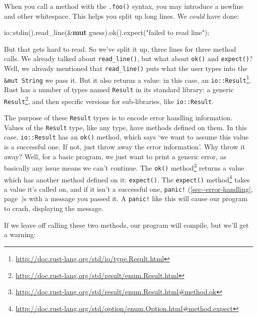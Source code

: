 \documentclass[a4paper,]{book}
\renewcommand*{\hyperref}[2][\ar]{%
  \def\ar{#2}%
  #2 (\autoref{#1}, page~\pageref{#1})}
\newenvironment{Shaded}{\begin{snugshade}}{\end{snugshade}}
\newcommand{\KeywordTok}[1]{\textcolor[rgb]{0.13,0.29,0.53}{\textbf{{#1}}}}
\newcommand{\StringTok}[1]{\textcolor[rgb]{0.31,0.60,0.02}{{#1}}}
\newcommand{\CommentTok}[1]{\textcolor[rgb]{0.56,0.35,0.01}{\textit{{#1}}}}
\newcommand{\NormalTok}[1]{{#1}}
\renewcommand{\href}[2]{#2\footnote{\url{#1}}}
\begin{document}
When you call a method with the \texttt{.foo()} syntax, you may
introduce a newline and other whitespace. This helps you split up long
lines. We \emph{could} have done:

\begin{Shaded}
\begin{Highlighting}[]
    \NormalTok{io::stdin().read_line(&}\KeywordTok{mut} \NormalTok{guess).ok().expect(}\StringTok{"failed to read line"}\NormalTok{);}
\end{Highlighting}
\end{Shaded}

But that gets hard to read. So we've split it up, three lines for three
method calls. We already talked about \texttt{read\_line()}, but what
about \texttt{ok()} and \texttt{expect()}? Well, we already mentioned
that \texttt{read\_line()} puts what the user types into the
\texttt{\&mut\ String} we pass it. But it also returns a value: in this
case, an
\href{http://doc.rust-lang.org/std/io/type.Result.html}{\texttt{io::Result}}.
Rust has a number of types named \texttt{Result} in its standard
library: a generic
\href{http://doc.rust-lang.org/std/result/enum.Result.html}{\texttt{Result}},
and then specific versions for sub-libraries, like \texttt{io::Result}.

The purpose of these \texttt{Result} types is to encode error handling
information. Values of the \texttt{Result} type, like any type, have
methods defined on them. In this case, \texttt{io::Result} has an
\texttt{ok()} method, which says `we want to assume this value is a
successful one. If not, just throw away the error information'. Why
throw it away? Well, for a basic program, we just want to print a
generic error, as basically any issue means we can't continue. The
\href{http://doc.rust-lang.org/std/result/enum.Result.html\#method.ok}{\texttt{ok()}
method} returns a value which has another method defined on it:
\texttt{expect()}. The
\href{http://doc.rust-lang.org/std/option/enum.Option.html\#method.expect}{\texttt{expect()}
method} takes a value it's called on, and if it isn't a successful one,
\hyperref[sec--error-handling]{\texttt{panic!}}s with a message you
passed it. A \texttt{panic!} like this will cause our program to crash,
displaying the message.

If we leave off calling these two methods, our program will compile, but
we'll get a warning:

\begin{Shaded}
\end{Shaded}
\end{document}
